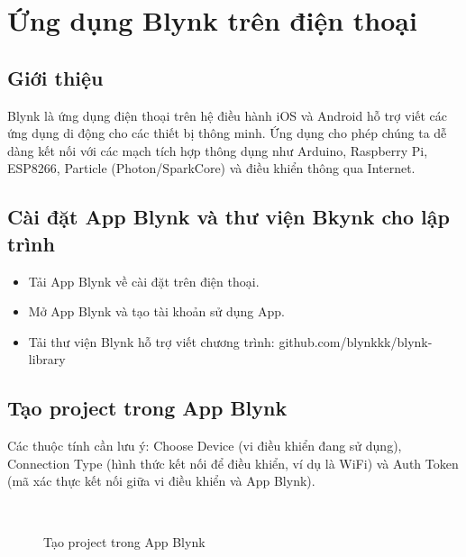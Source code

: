\newpage
\section{Ứng dụng Blynk trên điện thoại}
\subsection{Giới thiệu}
	Blynk là ứng dụng điện thoại trên hệ điều hành iOS và Android hỗ trợ viết các ứng dụng di động cho các thiết bị thông minh. Ứng dụng cho phép chúng ta dễ dàng kết nối với các mạch tích hợp thông dụng như Arduino, Raspberry Pi, ESP8266, Particle (Photon/SparkCore) và điều khiển thông qua Internet.
\subsection{Cài đặt App Blynk và thư viện Bkynk cho lập trình}
    \begin{itemize}
        \item Tải App Blynk về cài đặt trên điện thoại.
        \item Mở App Blynk và tạo tài khoản sử dụng App.
        \item Tải thư viện Blynk hỗ trợ viết chương trình: github.com/blynkkk/blynk-library
    \end{itemize}
\subsection{Tạo project trong App Blynk}
    Các thuộc tính cần lưu ý: Choose Device (vi điều khiển đang sử dụng), Connection Type (hình thức kết nối để điều khiển, ví dụ là WiFi) và Auth Token (mã xác thực kết nối giữa vi điều khiển và App Blynk).
        \begin{figure}[!ht]
            \begin{center}
                \\
            \end{center}
            \caption{Tạo project trong App Blynk}\label{Fig:app-blynk-project}
        \end{figure}
